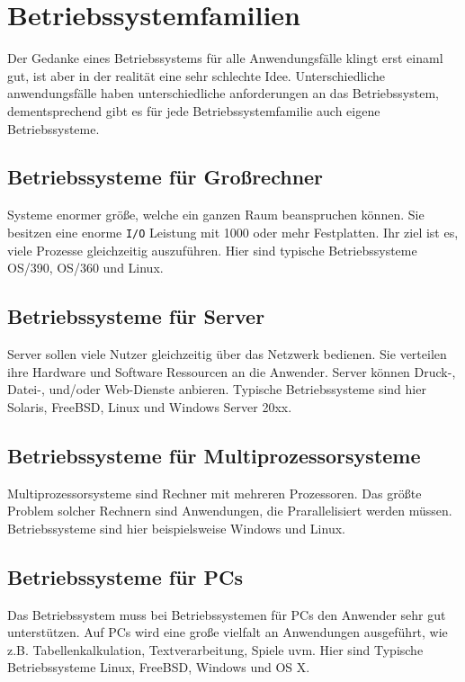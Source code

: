 \section{Betriebssystemfamilien}

Der Gedanke eines Betriebssystems für alle Anwendungsfälle klingt erst einaml gut, ist aber in der realität eine sehr schlechte Idee. Unterschiedliche anwendungsfälle haben unterschiedliche anforderungen an das Betriebssystem, dementsprechend gibt es für jede Betriebssystemfamilie auch eigene Betriebssysteme.

\subsection{Betriebssysteme für Großrechner}

Systeme enormer größe, welche ein ganzen Raum beanspruchen können. Sie besitzen eine enorme \texttt{I/O} Leistung mit 1000 oder mehr Festplatten. Ihr ziel ist es, viele Prozesse gleichzeitig auszuführen. Hier sind typische Betriebssysteme OS/390, OS/360 und Linux.

\subsection{Betriebssysteme für Server}

Server sollen viele Nutzer gleichzeitig über das Netzwerk bedienen. Sie verteilen ihre Hardware und Software Ressourcen an die Anwender. Server können Druck-, Datei-, und/oder Web-Dienste anbieren. Typische Betriebssysteme sind hier Solaris, FreeBSD, Linux und Windows Server 20xx.

\subsection{Betriebssysteme für Multiprozessorsysteme}

Multiprozessorsysteme sind Rechner mit mehreren Prozessoren. Das größte Problem solcher Rechnern sind Anwendungen, die Prarallelisiert werden müssen. Betriebssysteme sind hier beispielsweise Windows und Linux.

\subsection{Betriebssysteme für PCs}

Das Betriebssystem muss bei Betriebssystemen für PCs den Anwender sehr gut unterstützen. Auf PCs wird eine große vielfalt an Anwendungen ausgeführt, wie z.B. Tabellenkalkulation, Textverarbeitung, Spiele uvm. Hier sind Typische Betriebssysteme Linux, FreeBSD, Windows und OS X.

